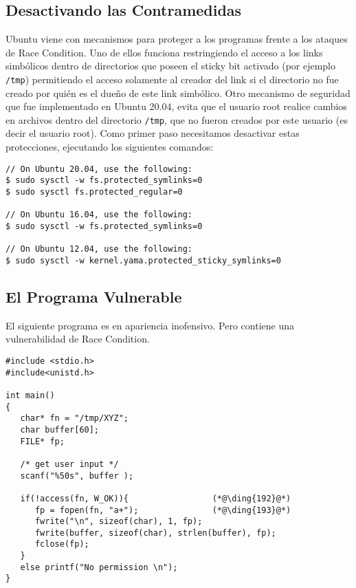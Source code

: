 \subsection{Desactivando las Contramedidas}

Ubuntu viene con mecanismos para proteger a los programas frente a los ataques de Race Condition. Uno de ellos funciona restringiendo el acceso a los links simbólicos dentro de  directorios que poseen el sticky bit activado (por ejemplo {\tt /tmp}) permitiendo el acceso solamente al creador del link si el directorio no fue creado por quién es el dueño de este link simbólico.
Otro mecanismo de seguridad que fue implementado en Ubuntu 20.04, evita que el usuario root realice cambios en archivos dentro del directorio \texttt{/tmp}, que no fueron creados por este usuario (es decir el usuario root).
Como primer paso necesitamos desactivar estas protecciones, ejecutando los siguientes comandos:

\begin{lstlisting}
// On Ubuntu 20.04, use the following:
$ sudo sysctl -w fs.protected_symlinks=0
$ sudo sysctl fs.protected_regular=0

// On Ubuntu 16.04, use the following:
$ sudo sysctl -w fs.protected_symlinks=0

// On Ubuntu 12.04, use the following:
$ sudo sysctl -w kernel.yama.protected_sticky_symlinks=0
\end{lstlisting}


\subsection{El Programa Vulnerable}

El siguiente programa es en apariencia inofensivo. Pero contiene una vulnerabilidad de Race Condition.

\begin{lstlisting}[caption={The vulnerable program (\texttt{vulp.c})}]
#include <stdio.h>
#include<unistd.h>

int main()
{
   char* fn = "/tmp/XYZ";
   char buffer[60];
   FILE* fp;

   /* get user input */
   scanf("%50s", buffer );

   if(!access(fn, W_OK)){                 (*@\ding{192}@*)
      fp = fopen(fn, "a+");               (*@\ding{193}@*)
      fwrite("\n", sizeof(char), 1, fp);
      fwrite(buffer, sizeof(char), strlen(buffer), fp);
      fclose(fp);
   }
   else printf("No permission \n");
}
\end{lstlisting}

